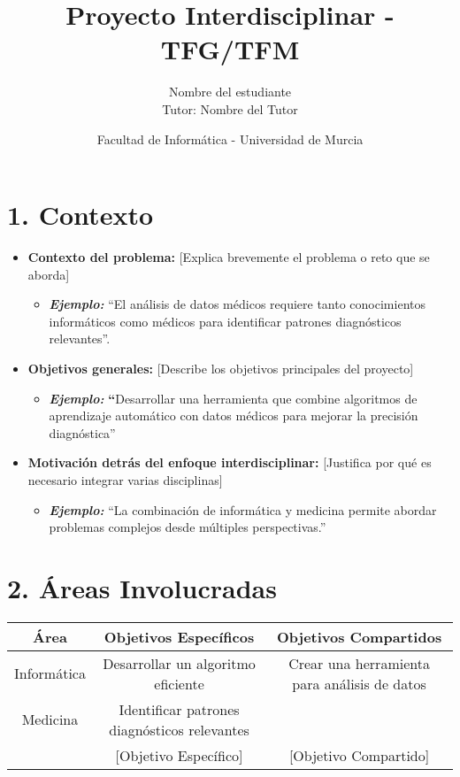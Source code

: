 \documentclass[12pt, a4paper]{article}
\title{\textbf{Proyecto Interdisciplinar - TFG/TFM}}
\author{Nombre del estudiante \\ Tutor: Nombre del Tutor}
\date{Facultad de Informática - Universidad de Murcia}
\begin{document}
\maketitle
\section*{1. Contexto}
\begin{itemize}
    \item \textbf{Contexto del problema:} [Explica brevemente el problema o reto que se aborda]
    \begin{itemize}
        \item \textbf{\textit{Ejemplo:}} “El análisis de datos médicos requiere tanto conocimientos informáticos como médicos para identificar patrones diagnósticos relevantes”.
    \end{itemize}
    \item \textbf{Objetivos generales: }[Describe los objetivos principales del proyecto]
    \begin{itemize}
        \item \textbf{\textit{Ejemplo:}}\textbf{ “}Desarrollar una herramienta que combine algoritmos de aprendizaje automático con datos médicos para mejorar la precisión diagnóstica”
    \end{itemize}
    \item \textbf{Motivación detrás del enfoque interdisciplinar: }[Justifica por qué es necesario integrar varias disciplinas]
    \begin{itemize}
        \item \textbf{\textit{Ejemplo:}} “La combinación de informática y medicina permite abordar problemas complejos desde múltiples perspectivas.”

    \end{itemize}

    
\end{itemize}



\section*{2. Áreas Involucradas}
\begin{tabular}{|c|c|c|}
    \hline
    \textbf{Área} & \textbf{Objetivos Específicos} & \textbf{Objetivos Compartidos} \\ \hline
    Informática & Desarrollar un algoritmo eficiente & Crear una herramienta para análisis de datos \\ \hline
    Medicina & Identificar patrones diagnósticos relevantes &  \\ \hline
    [Área 3] & [Objetivo Específico] & [Objetivo Compartido] \\ \hline
\end{tabular}
\end{document}
